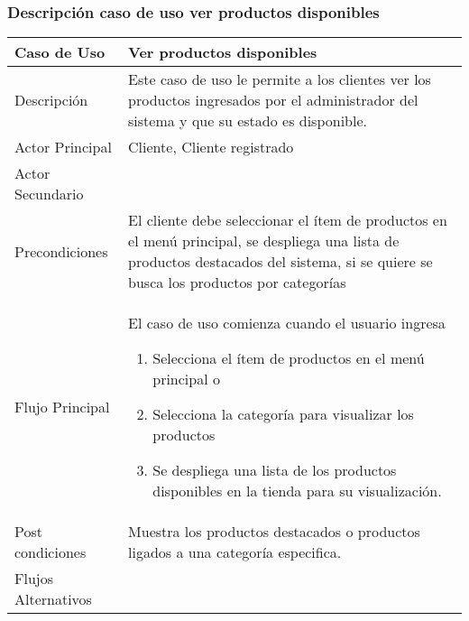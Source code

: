 \documentclass[12pt,a4paper]{article}
\begin{document}
        \newpage
\subsubsection*{Descripción caso de uso ver productos disponibles}
\begin{table}[h]
        \centering
        \begin{tabular}{| p{3cm}| p{11cm} |} 
        \hline  
        Caso de Uso         &    \textbf{Ver productos disponibles }   \\ 
        \hline
        Descripción         &      Este caso de uso le permite a los clientes ver los productos ingresados por el administrador del sistema y que su estado es disponible. \\ 
        \hline
        Actor Principal     &  Cliente, Cliente registrado    \\ 
        \hline
        Actor Secundario    &       \\ 
        \hline
        Precondiciones      &  El cliente debe seleccionar el ítem de productos en el menú principal, se despliega una lista de productos destacados del sistema, si se quiere se busca los productos por categorías   	\\
        \hline
        Flujo Principal     &    El caso de uso comienza cuando el usuario ingresa

            \begin{enumerate}
                \item Selecciona el ítem de productos en el menú principal o
                \item Selecciona la categoría para visualizar los productos
                \item Se despliega una lista de los productos disponibles en la tienda para su visualización.
            \end{enumerate}
        \\  
        \hline
        Post condiciones    &    Muestra los productos destacados o productos ligados a una categoría especifica.   \\  
        \hline
        Flujos Alternativos &       \\  
        \hline
        \end{tabular}
    \end{table}

    \newpage
\end{document}
